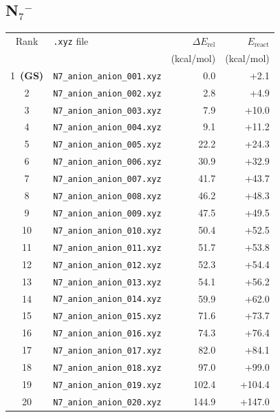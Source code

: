 \documentclass[11pt,a4paper]{article}
\begin{document}
\subsection*{N$_{7}$$^{-}$}
\begin{longtable}{clrr}
\toprule
Rank & \texttt{.xyz} file & $\Delta E_\text{rel}$ & $E_\text{react}$ \\
 & & (kcal/mol) & (kcal/mol) \\
\midrule\endhead
\rowcolor{gs}1~\textbf{(GS)} & \texttt{N7\_anion\_anion\_001.xyz} & 0.0 & +2.1 \\
2 & \texttt{N7\_anion\_anion\_002.xyz} & 2.8 & +4.9 \\
3 & \texttt{N7\_anion\_anion\_003.xyz} & 7.9 & +10.0 \\
4 & \texttt{N7\_anion\_anion\_004.xyz} & 9.1 & +11.2 \\
5 & \texttt{N7\_anion\_anion\_005.xyz} & 22.2 & +24.3 \\
6 & \texttt{N7\_anion\_anion\_006.xyz} & 30.9 & +32.9 \\
7 & \texttt{N7\_anion\_anion\_007.xyz} & 41.7 & +43.7 \\
8 & \texttt{N7\_anion\_anion\_008.xyz} & 46.2 & +48.3 \\
9 & \texttt{N7\_anion\_anion\_009.xyz} & 47.5 & +49.5 \\
10 & \texttt{N7\_anion\_anion\_010.xyz} & 50.4 & +52.5 \\
11 & \texttt{N7\_anion\_anion\_011.xyz} & 51.7 & +53.8 \\
12 & \texttt{N7\_anion\_anion\_012.xyz} & 52.3 & +54.4 \\
13 & \texttt{N7\_anion\_anion\_013.xyz} & 54.1 & +56.2 \\
14 & \texttt{N7\_anion\_anion\_014.xyz} & 59.9 & +62.0 \\
15 & \texttt{N7\_anion\_anion\_015.xyz} & 71.6 & +73.7 \\
16 & \texttt{N7\_anion\_anion\_016.xyz} & 74.3 & +76.4 \\
17 & \texttt{N7\_anion\_anion\_017.xyz} & 82.0 & +84.1 \\
18 & \texttt{N7\_anion\_anion\_018.xyz} & 97.0 & +99.0 \\
19 & \texttt{N7\_anion\_anion\_019.xyz} & 102.4 & +104.4 \\
20 & \texttt{N7\_anion\_anion\_020.xyz} & 144.9 & +147.0 \\
\bottomrule
\end{longtable}
\end{document}
